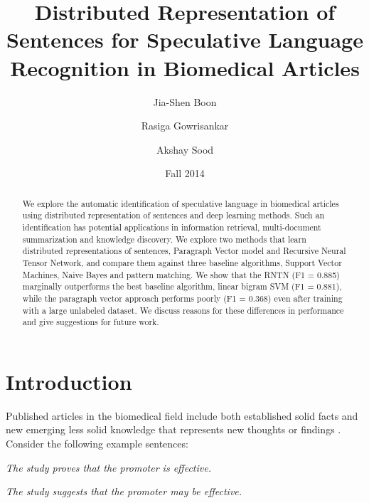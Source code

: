 \documentclass{article}
\begin{document}
\title{Distributed Representation of Sentences for Speculative Language Recognition in Biomedical Articles}
\author{Jia-Shen Boon \and Rasiga Gowrisankar \and Akshay Sood}
\date{Fall 2014}
\maketitle

\begin{abstract}


We explore the automatic identification of speculative language in biomedical articles using distributed representation of sentences and deep learning methods. Such an identification has potential applications in information retrieval, multi-document summarization and knowledge discovery. We explore two methods that learn distributed representations of sentences, Paragraph Vector model and Recursive Neural Tensor Network, and compare them against  three baseline algorithms, Support Vector Machines, Naive Bayes and pattern matching. We show that the RNTN (F1 = 0.885) marginally outperforms the best baseline algorithm, linear bigram SVM (F1 = 0.881), while the paragraph vector approach performs poorly (F1 = 0.368) even after training with a large unlabeled dataset. We discuss reasons for these differences in performance and give suggestions for future work.
%
%


\end{abstract}

\section{Introduction}

	Published articles in the biomedical field include both established solid facts and new emerging less solid knowledge that represents new thoughts or findings \autocite{Medlock2008}. Consider the following example sentences:

{\it The study proves that the promoter is effective.}

{\it The study suggests that the promoter may be effective.}
\end{document}
